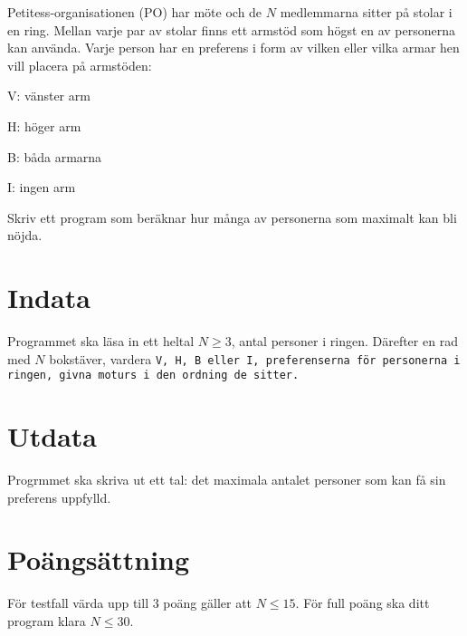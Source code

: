 
Petitess-organisationen (PO) har möte och de $N$ medlemmarna sitter på stolar i en ring. Mellan varje par av stolar finns ett armstöd som högst en av personerna kan använda. Varje person har en preferens i form av vilken eller vilka armar hen vill placera på armstöden:
\begin{list}
\item V: vänster arm
\item H: höger arm
\item B: båda armarna
\item I: ingen arm
\end{list}

Skriv ett program som beräknar hur många av personerna som maximalt kan bli nöjda.

\section*{Indata}
Programmet ska läsa in ett heltal $N\ge 3$, antal personer i ringen. Därefter en rad med $N$ bokstäver, vardera \tt{V}, \tt{H}, \tt{B} eller \tt{I}, preferenserna för personerna i ringen, givna moturs i den ordning de sitter.

\section*{Utdata}
Progrmmet ska skriva ut ett tal: det maximala antalet personer som kan få sin preferens uppfylld.

\section*{Poängsättning}

För testfall värda upp till $3$ poäng gäller att $N\le 15$. För full
poäng ska ditt program klara $N\le 30$.
